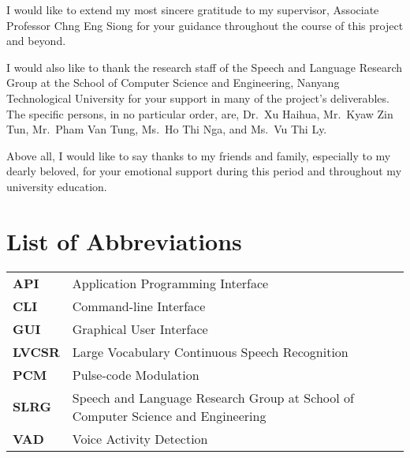 I would like to extend my most sincere gratitude to my supervisor,
Associate Professor Chng Eng Siong for your guidance throughout
the course of this project and beyond.

I would also like to thank the research staff of the Speech
and Language Research Group at the School of Computer Science and Engineering,
Nanyang Technological University for your support in many of the project's
deliverables. The specific persons, in no particular order, are, Dr.\ Xu Haihua,
Mr.\ Kyaw Zin Tun, Mr.\ Pham Van Tung, Ms.\ Ho Thi Nga, and Ms.\ Vu Thi Ly.

Above all, I would like to say thanks to my friends and family, especially to my
dearly beloved, for your emotional support during this period and throughout my
university education.
\newpage

\tableofcontents
\newpage

\listoffigures
\newpage

\listoftables
\newpage

\chapter*{List of Abbreviations}
\begin{tabu}{lX}
    \textbf{API} & Application Programming Interface \\
    \textbf{CLI} & Command-line Interface \\
    \textbf{GUI} & Graphical User Interface \\
    \textbf{LVCSR} & Large Vocabulary Continuous Speech Recognition \\
    \textbf{PCM} & Pulse-code Modulation \\
    \textbf{SLRG} & Speech and Language Research Group at School of Computer
    Science and Engineering \\
    \textbf{VAD} & Voice Activity Detection
\end{tabu}
\newpage
